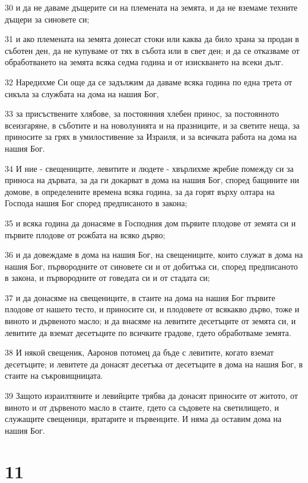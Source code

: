 \par 30 и да не даваме дъщерите си на племената на земята, и да не вземаме техните дъщери за синовете си;
\par 31 и ако племената на земята донесат стоки или каква да било храна за продан в съботен ден, да не купуваме от тях в събота или в свет ден; и да се отказваме от обработването на земята всяка седма година и от изискването на всеки дълг.
\par 32 Наредихме Си още да се задължим да даваме всяка година по една трета от сикъла за службата на дома на нашия Бог,
\par 33 за присъствените хлябове, за постоянния хлебен принос, за постоянното всеизгаряне, в съботите и на новолунията и на празниците, и за светите неща, за приносите за грях в умилостивение за Израиля, и за всичката работа на дома на нашия Бог.
\par 34 И ние - свещениците, левитите и людете - хвърлихме жребие помежду си за приноса на дървата, за да ги докарват в дома на нашия Бог, според бащините ни домове, в определените времена всяка година, за да горят върху олтара на Господа нашия Бог според предписаното в закона;
\par 35 и всяка година да донасяме в Господния дом първите плодове от земята си и първите плодове от рожбата на всяко дърво;
\par 36 и да довеждаме в дома на нашия Бог, на свещениците, които служат в дома на нашия Бог, първородните от синовете си и от добитъка си, според предписаното в закона, и първородните от говедата си и от стадата си;
\par 37 и да донасяме на свещениците, в стаите на дома на нашия Бог първите плодове от нашето тесто, и приносите си, и плодовете от всякакво дърво, тоже и виното и дървеното масло; и да внасяме на левитите десетъците от земята си, и левитите да вземат десетъците по всичките градове, гдето обработваме земята.
\par 38 И някой свещеник, Ааронов потомец да бъде с левитите, когато вземат десетъците; и левитете да донасят десетъка от десетъците в дома на нашия Бог, в стаите на съкровищницата.
\par 39 Защото израилтяните и левийците трябва да донасят приносите от житото, от виното и от дървеното масло в стаите, гдето са съдовете на светилището, и служащите свещеници, вратарите и първенците. И няма да оставим дома на нашия Бог.

\chapter{11}

